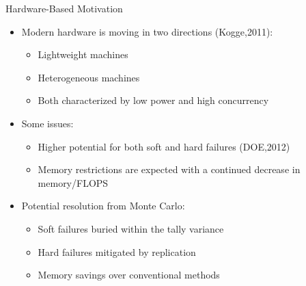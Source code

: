 \documentclass{beamer}
\begin{document}
\begin{frame}{Hardware-Based Motivation}

  \begin{itemize}
  \item Modern hardware is moving in two directions (Kogge,2011):
    \begin{itemize}
    \item Lightweight machines
    \item Heterogeneous machines
    \item Both characterized by low power and high concurrency
    \end{itemize}
    \medskip \medskip
  \item Some issues:
    \begin{itemize}
    \item Higher potential for both soft and hard failures (DOE,2012)
    \item Memory restrictions are expected with a continued decrease
      in memory/FLOPS
    \end{itemize}
    \medskip \medskip
  \item Potential resolution from Monte Carlo:
    \begin{itemize}
    \item Soft failures buried within the tally variance
    \item Hard failures mitigated by replication
    \item Memory savings over conventional methods
    \end{itemize}
  \end{itemize}

\end{frame}
\end{document}
